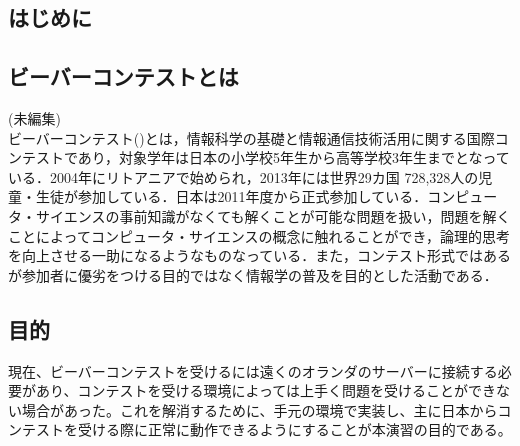 \documentclass[a4paper]{jarticle}
\begin{document}
\maketitle
\begin{multicols}{2}
\setcounter{page}{27}

\section{はじめに}

\subsection{ビーバーコンテストとは}
(未編集)\\
ビーバーコンテスト(\cite{bebras-contest, bebras-pdf})とは，情報科学の基礎と情報通信技術活用に関する国際コンテストであり，対象学年は日本の小学校5年生から高等学校3年生までとなっている．2004年にリトアニアで始められ，2013年には世界29カ国 728,328人の児童・生徒が参加している．日本は2011年度から正式参加している．コンピュータ・サイエンスの事前知識がなくても解くことが可能な問題を扱い，問題を解くことによってコンピュータ・サイエンスの概念に触れることができ，論理的思考を向上させる一助になるようなものなっている．また，コンテスト形式ではあるが参加者に優劣をつける目的ではなく情報学の普及を目的とした活動である．

\subsection{目的}
現在、ビーバーコンテストを受けるには遠くのオランダのサーバーに接続する必要があり、コンテストを受ける環境によっては上手く問題を受けることができない場合があった。これを解消するために、手元の環境で実装し、主に日本からコンテストを受ける際に正常に動作できるようにすることが本演習の目的である。


\end{multicols}
\end{document}
